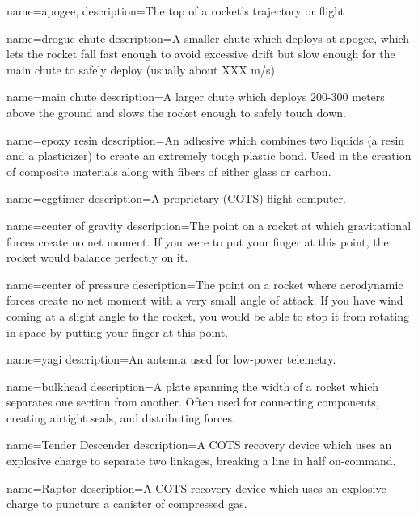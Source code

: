 \makeglossaries

{
    name=apogee,
    description={The top of a rocket's trajectory or flight}
}

{
    name={drogue chute}
    description={A smaller chute which deploys at apogee, which lets the rocket fall fast enough to avoid excessive drift but slow enough for the main chute to safely deploy (usually about XXX m/s)}
}

{
    name={main chute}
    description={A larger chute which deploys 200-300 meters above the ground and slows the rocket enough to safely touch down.}
}

{
    name={epoxy resin}
    description={An adhesive which combines two liquids (a resin and a plasticizer) to create an extremely tough plastic bond. Used in the creation of composite materials along with fibers of either glass or carbon.}
}

{
    name=eggtimer
    description={A proprietary (COTS) flight computer.}
}

{
    name={center of gravity}
    description={The point on a rocket at which gravitational forces create no net moment. If you were to put your finger at this point, the rocket would balance perfectly on it.}
}

{
    name={center of pressure}
    description={The point on a rocket where aerodynamic forces create no net moment with a very small angle of attack. If you have wind coming at a slight angle to the rocket, you would be able to stop it from rotating in space by putting your finger at this point.}
}

{
    name=yagi
    description={An antenna used for low-power telemetry.}
}

{
    name=bulkhead
    description={A plate spanning the width of a rocket which separates one section from another. Often used for connecting components, creating airtight seals, and distributing forces.}
}

{
    name={Tender Descender}
    description={A COTS recovery device which uses an explosive charge to separate two linkages, breaking a line in half on-command.}
}

{
    name=Raptor
    description={A COTS recovery device which uses an explosive charge to puncture a canister of compressed gas.}
}

